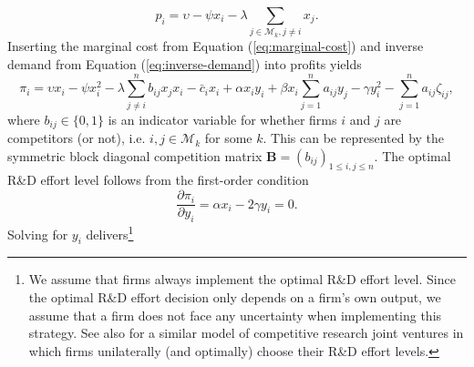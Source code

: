 \begin{equation}
p_i = \upsilon - \psi x_i - \lambda \sum_{j \in \mathcal{M}_k, j \neq i} x_j.
\label{eq:inverse-demand}
\end{equation} 
Inserting the marginal cost from Equation (\ref{eq:marginal-cost}) and inverse demand from Equation (\ref{eq:inverse-demand}) into profits yields
\begin{equation}
\pi_i = \upsilon  x_i - \psi x_i^2 - \lambda \sum_{j \ne i}^n b_{ij} x_j x_i - \bar{c}_i x_i + \alpha x_i y_i +
\beta x_i \sum_{j=1}^n a_{ij} y_j - \gamma y_i^2 - \sum_{j=1}^n a_{ij}\zeta_{ij},
\label{eq:profit-app}
\end{equation}
where $b_{ij} \in \{0,1\}$ is an indicator variable for whether firms $i$ and $j$ are competitors (or not), i.e. $i,j \in \mathcal{M}_k$ for some $k$. This can be represented by the symmetric block diagonal competition matrix $\mathbf{B}=(b_{ij})_{1\le i,j \le n}$. The optimal R\&D effort level follows from the first-order condition 
\begin{equation*}
\frac{\partial \pi_i}{\partial y_i} = \alpha x_i -2 \gamma y_i = 0.
\end{equation*}
Solving for $y_i$ delivers\footnote{%
We assume that firms always implement the optimal R\&D effort level. Since
the optimal R\&D effort decision only depends on a firm's own output, we
assume that a firm does not face any uncertainty when implementing this
strategy. %
See also \citet{kamien92:_resear_joint_ventur_and_r_d_cartel} for a similar
model of competitive research joint ventures in which firms unilaterally (and optimally) choose their R\&D
effort levels.}  
